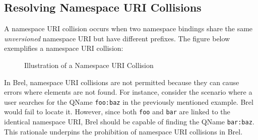 


\subsection{Resolving Namespace URI Collisions}

A namespace URI collision occurs when two namespace bindings share the same \textit{unversioned} namespace URI but have different prefixes.
The figure below exemplifies a namespace URI collision:

\begin{figure}[H]
\caption{Illustration of a Namespace URI Collision}
\label{fig:namespace_uri_collision_example}
\end{figure}

In Brel, namespace URI collisions are not permitted because they can cause errors where elements are not found.
For instance, consider the scenario where a user searches for the QName \texttt{foo:baz} in the previously mentioned example. Brel would fail to locate it.
However, since both \texttt{foo} and \texttt{bar} are linked to the identical namespace URI, Brel should be capable of finding the QName \texttt{bar:baz}.
This rationale underpins the prohibition of namespace URI collisions in Brel.


